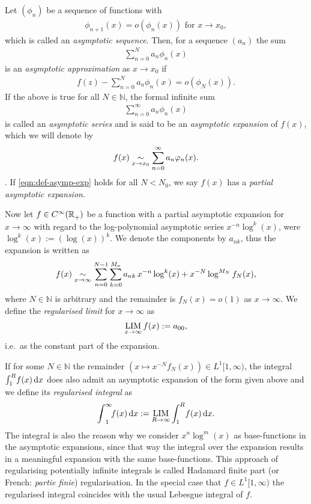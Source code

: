 \begin{Definition}
  Let $(\phi_n)$ be a sequence of functions with
\begin{align*}
  \phi_{n+1}(x) = o(\phi_n(x))\text{ for $x\to x_0$},
\end{align*}
  which is called an \emph{asymptotic sequence}. Then, for a sequence $(a_n)$
  the sum
  \begin{align*}
    \sum_{n=0}^N a_n\phi_n(x)
  \end{align*}
  is an \emph{asymptotic approximation} as $x\to x_0$ if
  \begin{align*}
    \label{eqn:def-asymp-exp}
    f(z) - \sum_{n=0}^N a_n\phi_n(x) = o(\phi_N(x)).
  \end{align*}
  If the above is true for all $N\in\mathbb{N}$, the formal infinite sum
  \begin{align*}
    \sum_{n=0}^\infty a_n\phi_n(x)
  \end{align*}
  is called an \emph{asymptotic series} and is said to be an \emph{asymptotic
  expansion} of $f(x)$, which we will denote by
  \begin{align*}
    f(x) \SimAs{x\to x_0} \sum_{n=0}^\infty a_n\phi_n(x).
  \end{align*}.
  If \eqref{eqn:def-asymp-exp} holds for all $N < N_0$, we say $f(x)$ has a
  \emph{partial asymptotic expansion}.
\end{Definition}

Now let $f\in\Cinf(\Rplus)$ be a function with a partial asymptotic expansion
for $x\to\infty$ with regard to the log-polynomial asymptotic series
$x^{-n}\log^k(x)$, were $\log^k(x) := (\log(x))^k$. We denote the components by
$a_{nk}$, thus the expansion is written as
\begin{align*}
  f(x) \SimAs{x\to\infty} \sum_{n=0}^{N-1}\sum_{k=0}^{M_n}
  a_{nk}\,x^{-n}\log^k(x) + x^{-N}\log^{M_N}f_N(x),
\end{align*}
where $N\in\mathbb{N}$ is arbitrary and the remainder is $f_N(x) = o(1)$ as
$x\to\infty$. We define the \emph{regularised limit} for $x\to\infty$ as
\begin{align}
  \Reglim_{x\to\infty} f(x) := a_{00},
\end{align}
i.e.\ as the constant part of the expansion.

If for some $N\in\mathbb{N}$ the remainder $(x\mapsto x^{-N}f_N(x))\in
L^1[1,\infty)$, the integral $\Integ[R]{1}{x}{f(x)}$ does also admit an
asymptotic expansion of the form given above and we define its \emph{regularised
integral} as
\begin{align}
  \Regint{x}{f(x)} := \Reglim_{R\to\infty}\Integ[R]{1}{x}{f(x)}.
\end{align}
The integral is also the reason why we consider $x^n \log^m(x)$ as
base-functions in the asymptotic expansions, since that way the integral over
the expansion results in a meaningful expansion with the same base-functions.
This approach of regularising potentially infinite integrals is called Hadamard
finite part (or French: \textit{partie finie}) regularisation. In the special
case that $f\in L^1[1,\infty)$ the regularised integral coincides with the usual
Lebesgue integral of $f$.

